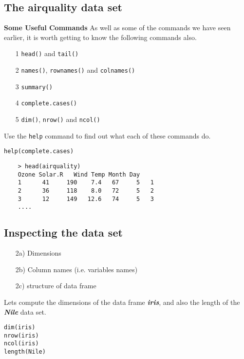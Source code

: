 \documentclass[12pt]{article}
\begin{document}
\subsection*{The airquality data set}

\textbf{Some Useful Commands}
As well as some of the commands we have seen earlier, it is worth getting to know the following commands also.
\begin{itemize}
\item[1] \texttt{head()} and \texttt{tail()}
\item[2] \texttt{names()}, \texttt{rownames()} and \texttt{colnames()}
\item[3] \texttt{summary()}
\item[4] \texttt{complete.cases()}
\item[5] \texttt{dim()}, \texttt{nrow()} and \texttt{ncol()}
\end{itemize}
Use the \texttt{help} command to find out what each of these commands do.
\begin{framed}
\begin{verbatim}
help(complete.cases)
\end{verbatim}
\end{framed}
\begin{framed}
	\begin{verbatim}
	> head(airquality)
	Ozone Solar.R  	Wind Temp Month Day
	1      41     190    7.4   67     5   1
	2      36     118    8.0   72     5   2
	3      12     149   12.6   74     5   3
	....
	\end{verbatim}
\end{framed}


\newpage
\subsection*{Inspecting the data set}

\begin{itemize}
\item[2a)] Dimensions
\item[2b)] Column names (i.e. variables names)
\item[2c)] structure of data frame
\end{itemize}
Lets compute the dimensions of the data frame \textit{\textbf{iris}}, and also the length of the \textit{\textbf{Nile}} data set.
\begin{framed}
\begin{verbatim}
dim(iris)
nrow(iris)
ncol(iris)
length(Nile)
\end{verbatim}
\end{framed}
\end{document}
